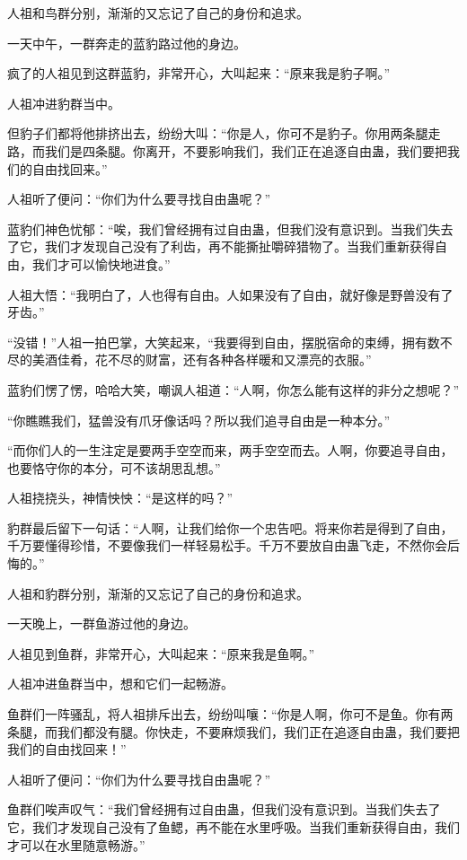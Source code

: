 \begin{this_body}
人祖和鸟群分别，渐渐的又忘记了自己的身份和追求。

一天中午，一群奔走的蓝豹路过他的身边。

疯了的人祖见到这群蓝豹，非常开心，大叫起来：“原来我是豹子啊。”

人祖冲进豹群当中。

但豹子们都将他排挤出去，纷纷大叫：“你是人，你可不是豹子。你用两条腿走路，而我们是四条腿。你离开，不要影响我们，我们正在追逐自由蛊，我们要把我们的自由找回来。”

人祖听了便问：“你们为什么要寻找自由蛊呢？”

蓝豹们神色忧郁：“唉，我们曾经拥有过自由蛊，但我们没有意识到。当我们失去了它，我们才发现自己没有了利齿，再不能撕扯嚼碎猎物了。当我们重新获得自由，我们才可以愉快地进食。”

人祖大悟：“我明白了，人也得有自由。人如果没有了自由，就好像是野兽没有了牙齿。”

“没错！”人祖一拍巴掌，大笑起来，“我要得到自由，摆脱宿命的束缚，拥有数不尽的美酒佳肴，花不尽的财富，还有各种各样暖和又漂亮的衣服。”

蓝豹们愣了愣，哈哈大笑，嘲讽人祖道：“人啊，你怎么能有这样的非分之想呢？”

“你瞧瞧我们，猛兽没有爪牙像话吗？所以我们追寻自由是一种本分。”

“而你们人的一生注定是要两手空空而来，两手空空而去。人啊，你要追寻自由，也要恪守你的本分，可不该胡思乱想。”

人祖挠挠头，神情怏怏：“是这样的吗？”

豹群最后留下一句话：“人啊，让我们给你一个忠告吧。将来你若是得到了自由，千万要懂得珍惜，不要像我们一样轻易松手。千万不要放自由蛊飞走，不然你会后悔的。”

人祖和豹群分别，渐渐的又忘记了自己的身份和追求。

一天晚上，一群鱼游过他的身边。

人祖见到鱼群，非常开心，大叫起来：“原来我是鱼啊。”

人祖冲进鱼群当中，想和它们一起畅游。

鱼群们一阵骚乱，将人祖排斥出去，纷纷叫嚷：“你是人啊，你可不是鱼。你有两条腿，而我们都没有腿。你快走，不要麻烦我们，我们正在追逐自由蛊，我们要把我们的自由找回来！”

人祖听了便问：“你们为什么要寻找自由蛊呢？”

鱼群们唉声叹气：“我们曾经拥有过自由蛊，但我们没有意识到。当我们失去了它，我们才发现自己没有了鱼鳃，再不能在水里呼吸。当我们重新获得自由，我们才可以在水里随意畅游。”


\end{this_body}
